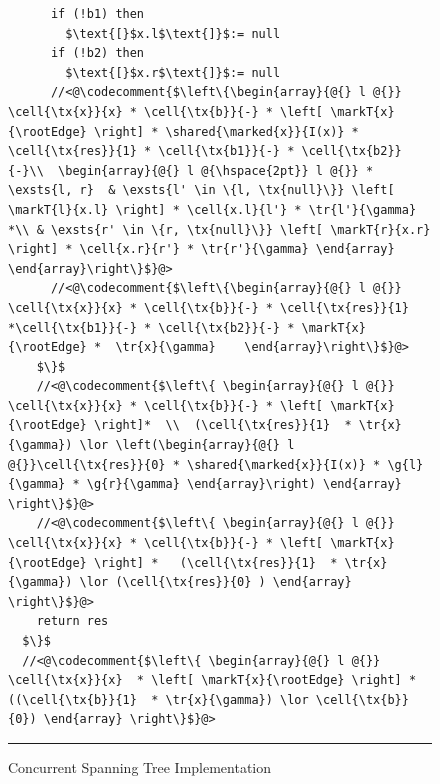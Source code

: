 \begin{figure}
\begin{lstlisting}
      if (!b1) then 
        $\text{[}$x.l$\text{]}$:= null
      if (!b2) then 
        $\text{[}$x.r$\text{]}$:= null
      //<@\codecomment{$\left\{\begin{array}{@{} l @{}}  \cell{\tx{x}}{x} * \cell{\tx{b}}{-} * \left[ \markT{x}{\rootEdge} \right] * \shared{\marked{x}}{I(x)} * \cell{\tx{res}}{1} * \cell{\tx{b1}}{-} * \cell{\tx{b2}}{-}\\  \begin{array}{@{} l @{\hspace{2pt}} l @{}} * \exsts{l, r}  & \exsts{l' \in \{l, \tx{null}\}} \left[ \markT{l}{x.l} \right] * \cell{x.l}{l'} * \tr{l'}{\gamma} *\\ & \exsts{r' \in \{r, \tx{null}\}} \left[ \markT{r}{x.r} \right] * \cell{x.r}{r'} * \tr{r'}{\gamma} \end{array} \end{array}\right\}$}@>
      //<@\codecomment{$\left\{\begin{array}{@{} l @{}}  \cell{\tx{x}}{x} * \cell{\tx{b}}{-} * \cell{\tx{res}}{1} *\cell{\tx{b1}}{-} * \cell{\tx{b2}}{-} * \markT{x}{\rootEdge} *  \tr{x}{\gamma}    \end{array}\right\}$}@>
    $\}$    
    //<@\codecomment{$\left\{ \begin{array}{@{} l @{}} \cell{\tx{x}}{x} * \cell{\tx{b}}{-} * \left[ \markT{x}{\rootEdge} \right]*  \\  (\cell{\tx{res}}{1}  * \tr{x}{\gamma}) \lor \left(\begin{array}{@{} l @{}}\cell{\tx{res}}{0} * \shared{\marked{x}}{I(x)} * \g{l}{\gamma} * \g{r}{\gamma} \end{array}\right) \end{array} \right\}$}@>
    //<@\codecomment{$\left\{ \begin{array}{@{} l @{}} \cell{\tx{x}}{x} * \cell{\tx{b}}{-} * \left[ \markT{x}{\rootEdge} \right] *   (\cell{\tx{res}}{1}  * \tr{x}{\gamma}) \lor (\cell{\tx{res}}{0} ) \end{array} \right\}$}@>
    return res
  $\}$
  //<@\codecomment{$\left\{ \begin{array}{@{} l @{}} \cell{\tx{x}}{x}  * \left[ \markT{x}{\rootEdge} \right] *  ((\cell{\tx{b}}{1}  * \tr{x}{\gamma}) \lor \cell{\tx{b}}{0}) \end{array} \right\}$}@>
\end{lstlisting}
\hrule\vspace*{-6pt}
\caption{Concurrent Spanning Tree Implementation}
\label{fig:conSpanningTree}
\end{figure}
